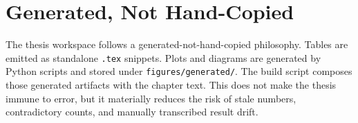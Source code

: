 \section{Generated, Not Hand-Copied}

The thesis workspace follows a generated-not-hand-copied philosophy. Tables are emitted as standalone \texttt{.tex} snippets. Plots and diagrams are generated by Python scripts and stored under \texttt{figures/generated/}. The build script composes those generated artifacts with the chapter text. This does not make the thesis immune to error, but it materially reduces the risk of stale numbers, contradictory counts, and manually transcribed result drift.
